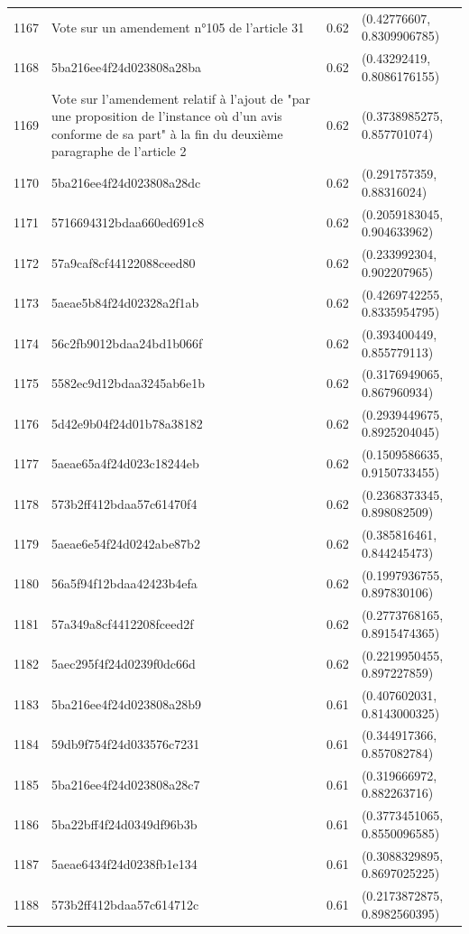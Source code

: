 \begin{table}[ht]
\begin{tabular}{rlrl}
  1167 & Vote sur un amendement n°105 de l'article 31 & 0.62 & (0.42776607, 0.8309906785) \\ 
  1168 & 5ba216ee4f24d023808a28ba & 0.62 & (0.43292419, 0.8086176155) \\ 
  1169 & Vote sur l'amendement relatif à l'ajout de "par une proposition de l'instance où d'un avis conforme de sa part" à la fin du deuxième paragraphe de l'article 2 & 0.62 & (0.3738985275, 0.857701074) \\ 
  1170 & 5ba216ee4f24d023808a28dc & 0.62 & (0.291757359, 0.88316024) \\ 
  1171 & 5716694312bdaa660ed691c8 & 0.62 & (0.2059183045, 0.904633962) \\ 
  1172 & 57a9caf8cf44122088ceed80 & 0.62 & (0.233992304, 0.902207965) \\ 
  1173 & 5aeae5b84f24d02328a2f1ab & 0.62 & (0.4269742255, 0.8335954795) \\ 
  1174 & 56c2fb9012bdaa24bd1b066f & 0.62 & (0.393400449, 0.855779113) \\ 
  1175 & 5582ec9d12bdaa3245ab6e1b & 0.62 & (0.3176949065, 0.867960934) \\ 
  1176 & 5d42e9b04f24d01b78a38182 & 0.62 & (0.2939449675, 0.8925204045) \\ 
  1177 & 5aeae65a4f24d023c18244eb & 0.62 & (0.1509586635, 0.9150733455) \\ 
  1178 & 573b2ff412bdaa57c61470f4 & 0.62 & (0.2368373345, 0.898082509) \\ 
  1179 & 5aeae6e54f24d0242abe87b2 & 0.62 & (0.385816461, 0.844245473) \\ 
  1180 & 56a5f94f12bdaa42423b4efa & 0.62 & (0.1997936755, 0.897830106) \\ 
  1181 & 57a349a8cf4412208fceed2f & 0.62 & (0.2773768165, 0.8915474365) \\ 
  1182 & 5aec295f4f24d0239f0dc66d & 0.62 & (0.2219950455, 0.897227859) \\ 
  1183 & 5ba216ee4f24d023808a28b9 & 0.61 & (0.407602031, 0.8143000325) \\ 
  1184 & 59db9f754f24d033576c7231 & 0.61 & (0.344917366, 0.857082784) \\ 
  1185 & 5ba216ee4f24d023808a28c7 & 0.61 & (0.319666972, 0.882263716) \\ 
  1186 & 5ba22bff4f24d0349df96b3b & 0.61 & (0.3773451065, 0.8550096585) \\ 
  1187 & 5aeae6434f24d0238fb1e134 & 0.61 & (0.3088329895, 0.8697025225) \\ 
  1188 & 573b2ff412bdaa57c614712c & 0.61 & (0.2173872875, 0.8982560395) \\ 

\end{tabular}
\end{table}
